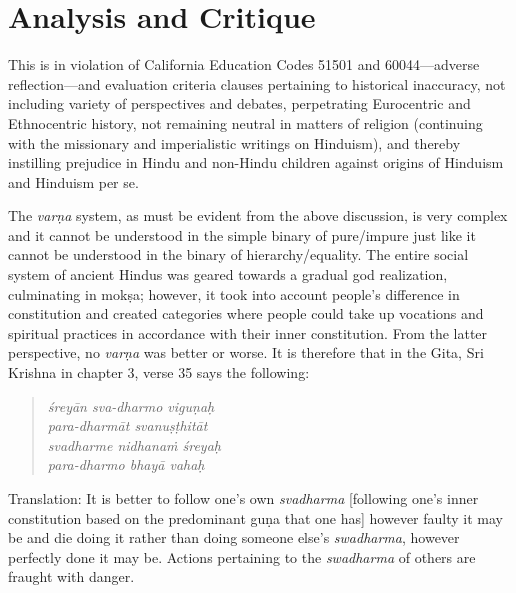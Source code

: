 \section*{Analysis and Critique} 

This is in violation of California Education Codes 51501 and 60044—adverse reflection—and evaluation criteria clauses pertaining to historical inaccuracy, not including variety of perspectives and debates, perpetrating Eurocentric and Ethnocentric history, not remaining neutral in matters of religion (continuing with the missionary and imperialistic writings on Hinduism), and thereby instilling prejudice in Hindu and non-Hindu children against origins of Hinduism and Hinduism per se.

The \textit{varṇa} system, as must be evident from the above discussion, is very complex and it cannot be understood in the simple binary of pure/impure just like it cannot be understood in the binary of hierarchy/equality. The entire social system of ancient Hindus was geared towards a gradual god realization, culminating in mokṣa; however, it took into account people’s difference in constitution and created categories where people could take up vocations and spiritual practices in accordance with their inner constitution. From the latter perspective, no \textit{varṇa} was better or worse. It is therefore that in the Gita, Sri Krishna in chapter 3, verse 35 says the following: 

\begin{quote}
\textit{śreyān sva-dharmo viguṇaḥ}\\
\textit{para-dharmāt svanuṣṭhitāt}\\
\textit{svadharme nidhanaṁ śreyaḥ}\\
\textit{para-dharmo bhayā vahaḥ}
\end{quote}
Translation: It is better to follow one’s own \textit{svadharma}  [following one’s inner constitution based on the predominant guṇa that one has] however faulty it may be and die doing it rather than doing someone else’s \textit{swadharma}, however perfectly done it may be. Actions pertaining to the \textit{swadharma} of others are fraught with danger. 

